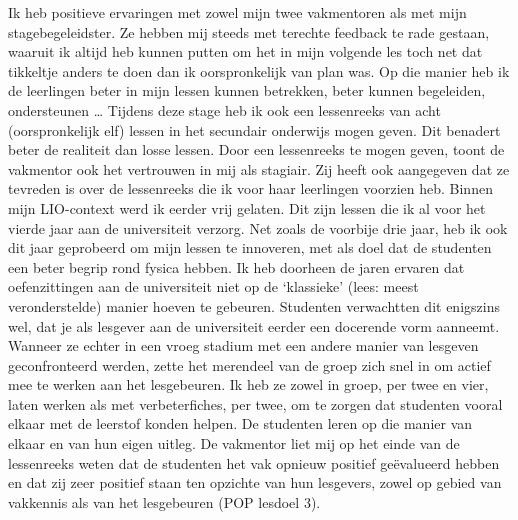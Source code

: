 \documentclass[a4paper,12pt,twoside]{article}%
\begin{document}
Ik heb positieve ervaringen met zowel mijn twee vakmentoren als met mijn stagebegeleidster. Ze hebben mij steeds met terechte feedback te rade gestaan, waaruit ik altijd heb kunnen putten om het in mijn volgende les toch net dat tikkeltje anders te doen dan ik oorspronkelijk van plan was. Op die manier heb ik de leerlingen beter in mijn lessen kunnen betrekken, beter kunnen begeleiden, ondersteunen \ldots{}  Tijdens deze stage heb ik ook een lessenreeks van acht (oorspronkelijk elf) lessen in het secundair onderwijs mogen geven. Dit benadert beter de realiteit dan losse lessen. Door een lessenreeks te mogen geven, toont de vakmentor ook het vertrouwen in mij als stagiair. Zij heeft ook aangegeven dat ze tevreden is over de lessenreeks die ik voor haar leerlingen voorzien heb.\newline
Binnen mijn LIO-context werd ik eerder vrij gelaten. Dit zijn lessen die ik al voor het vierde jaar aan de universiteit verzorg. Net zoals de voorbije drie jaar, heb ik ook dit jaar geprobeerd om mijn lessen te innoveren, met als doel dat de studenten een beter begrip rond fysica hebben. Ik heb doorheen de jaren ervaren dat oefenzittingen aan de universiteit niet op de `klassieke' (lees: meest veronderstelde) manier hoeven te gebeuren. Studenten verwachtten dit enigszins wel, dat je als lesgever aan de universiteit eerder een docerende vorm aanneemt. Wanneer ze echter in een vroeg stadium met een andere manier van lesgeven geconfronteerd werden, zette het merendeel van de groep zich snel in om actief mee te werken aan het lesgebeuren. Ik heb ze zowel in groep, per twee en vier, laten werken als met verbeterfiches, per twee, om te zorgen dat studenten vooral elkaar met de leerstof konden helpen. De studenten leren op die manier van elkaar en van hun eigen uitleg. De vakmentor liet mij op het einde van de lessenreeks weten dat de studenten het vak opnieuw positief geëvalueerd hebben en dat zij zeer positief staan ten opzichte van hun lesgevers, zowel op gebied van vakkennis als van het lesgebeuren (POP lesdoel 3). \newline\newline
\end{document}
